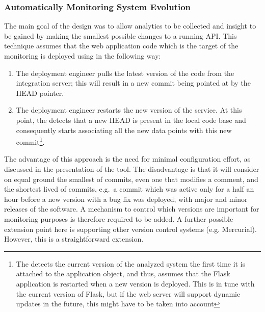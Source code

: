 \documentclass[conference]{IEEEtran}
\begin{document}

  \subsubsection{Automatically Monitoring System Evolution}

  The main goal of the \tool design was to allow analytics to be collected and insight to be gained by making the smallest possible changes to a running API. %
%
  This technique assumes that the web application code which is the target of the monitoring is deployed using \git in the following way: 

  \begin{enumerate}
    \item The deployment engineer pulls the latest version of the code from the integration server; this will result in a new commit being pointed at by the HEAD pointer. %
    \item The deployment engineer restarts the new version of the service. At this point, the \tool detects that a new HEAD is present in the local code base and consequently starts associating all the new data points with this new commit\footnote{The \tool detects the current version of the analyzed system the first time it is attached to the application object, and thus, assumes that the Flask application is restarted when a new version is deployed. This is in tune with the current version of Flask, but if the web server will support dynamic updates in the future, this might have to be taken into account}.
  \end{enumerate}

  The advantage of this approach is the need for minimal configuration effort, as discussed in the presentation of the tool. The disadvantage is that it will consider on equal ground the smallest of commits, even one that modifies a comment, and the shortest lived of commits, e.g.~a commit which was active only for a half an hour before a new version with a bug fix was deployed, with major and minor releases of the software. %
  A mechanism to control which versions are important for monitoring purposes is therefore required to be added.
%
  A further possible extension point here is supporting other version control systems (e.g. Mercurial). However, this is a straightforward extension.
\end{document}
